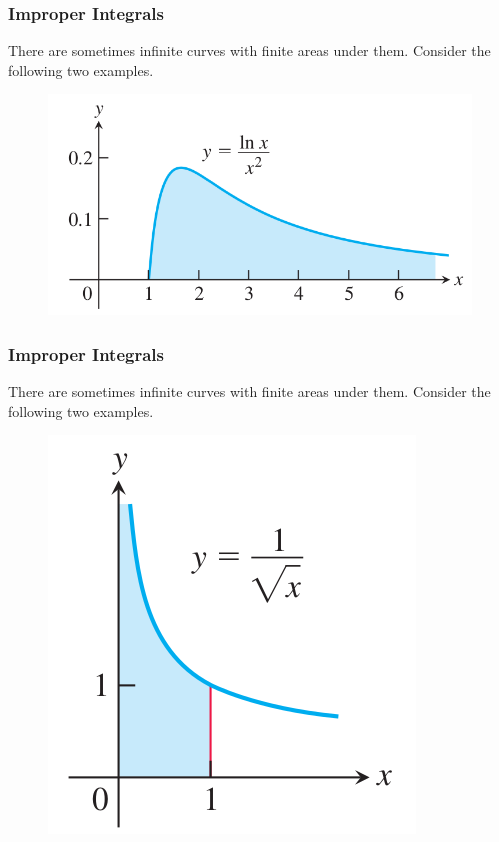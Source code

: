 \documentclass[xcolor=dvipsnames]{beamer}
\begin{document}
\begin{frame}
  \frametitle{Improper Integrals}
  There are sometimes infinite curves with finite areas under them.
  Consider the following two examples. 
  \begin{figure}[h]
    \includegraphics[scale=0.4]{./diagrams/improper1.png}
  \end{figure}
\end{frame}

\begin{frame}
  \frametitle{Improper Integrals}
  There are sometimes infinite curves with finite areas under them.
  Consider the following two examples. 
  \begin{figure}[h]
    \includegraphics[scale=0.5]{./diagrams/improper2.png}
  \end{figure}
\end{frame}
\end{document}
